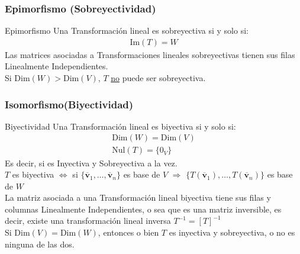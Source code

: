 \documentclass[a4paper, twoside]{article}
\numberwithin{equation}{section}
\numberwithin{figure}{section}
\numberwithin{table}{section}
\newcommand{\vect}[1]{\overline{\textbf{#1}}}
\newcommand{\nul}[1]{\text{Nul}(#1)}
\newcommand{\im}[1]{\text{Im}(#1)}
\newcommand{\dime}[1]{\text{Dim}(#1)}
\begin{document}
\subsubsection{Epimorfismo (Sobreyectividad)}
\begin{definicion*}{Epimorfismo}
	Una Transformación lineal es sobreyectiva si y solo si:
	\begin{align}
		\im{T}=W
	\end{align}
	Las matrices asociadas a Transformaciones lineales sobreyectivas tienen sus filas Linealmente Independientes.\\
	
	Si $\dime{W} > \dime{V}$, $T$ \underline{no} puede ser sobreyectiva.
\end{definicion*}

\subsubsection{Isomorfismo(Biyectividad)}
\begin{definicion*}{Biyectividad}
	Una Transformación lineal es biyectiva si y solo si:
	\begin{align}
		\dime{W}=\dime{V} \\
		\nul{T}=\{ 0_V \}
	\end{align}
	Es decir, si es Inyectiva y Sobreyectiva a la vez.\\
	
	$T$ es biyectiva $\Longleftrightarrow$ si $\{\vect{v}_1,\ldots,\vect{v}_n \}$ es base de $V$ $\Rightarrow$ $\{T(\vect{v}_1),\ldots,T(\vect{v}_n) \}$ es base de $W$\\
	La matriz asociada a una Transformación lineal biyectiva tiene sus filas y columnas Linealmente Independientes, o sea que es una matriz inversible, es decir, existe una transformación lineal inversa $T^{-1}=[T]^{-1}$\\
	
	Si $\dime{V}=\dime{W}$, entonces o bien $T$ es inyectiva y sobreyectiva, o no es ninguna de las dos.
\end{definicion*}
\end{document}
